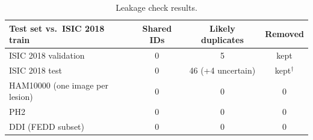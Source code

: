 \documentclass[10pt,a4paper]{article}
\begin{document}
\begin{table}[H]
\centering
\caption{Leakage check results.}
\label{tab:s-leakage}
\small
\begin{tabular}{lccc}
\toprule
Test set vs.\ ISIC 2018 train & Shared IDs & Likely duplicates & Removed \\
\midrule
ISIC 2018 validation & 0 & 5 & kept \\
ISIC 2018 test & 0 & 46 (+4 uncertain) & kept$^{\dagger}$ \\
HAM10000 (one image per lesion) & 0 & 0 & 0 \\
PH2 & 0 & 0 & 0 \\
DDI (FEDD subset) & 0 & 0 & 0 \\
\bottomrule
\end{tabular}
\par{}
\end{table}
\end{document}
